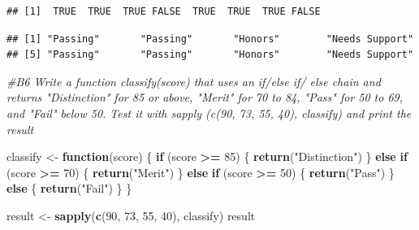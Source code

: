 \documentclass[
]{article}
\newenvironment{Shaded}{\begin{snugshade}}{\end{snugshade}}
\newcommand{\CommentTok}[1]{\textcolor[rgb]{0.56,0.35,0.01}{\textit{#1}}}
\newcommand{\ControlFlowTok}[1]{\textcolor[rgb]{0.13,0.29,0.53}{\textbf{#1}}}
\newcommand{\DecValTok}[1]{\textcolor[rgb]{0.00,0.00,0.81}{#1}}
\newcommand{\FunctionTok}[1]{\textcolor[rgb]{0.13,0.29,0.53}{\textbf{#1}}}
\newcommand{\NormalTok}[1]{#1}
\newcommand{\OtherTok}[1]{\textcolor[rgb]{0.56,0.35,0.01}{#1}}
\newcommand{\SpecialCharTok}[1]{\textcolor[rgb]{0.81,0.36,0.00}{\textbf{#1}}}
\newcommand{\StringTok}[1]{\textcolor[rgb]{0.31,0.60,0.02}{#1}}
\begin{document}
\begin{verbatim}
## [1]  TRUE  TRUE  TRUE FALSE  TRUE  TRUE  TRUE FALSE
\end{verbatim}

\begin{Shaded}
\end{Shaded}

\begin{verbatim}
## [1] "Passing"       "Passing"       "Honors"        "Needs Support"
## [5] "Passing"       "Passing"       "Honors"        "Needs Support"
\end{verbatim}

\begin{Shaded}
\begin{Highlighting}[]
\CommentTok{\#B6 Write a function classify(score) that uses an if/else if/ else chain and returns "Distinction" for 85 or above, "Merit" for 70 to 84, "Pass" for 50 to 69, and "Fail" below 50. Test it with sapply (c(90, 73, 55, 40), classify) and print the result}

\NormalTok{classify }\OtherTok{\textless{}{-}} \ControlFlowTok{function}\NormalTok{(score) \{}
  \ControlFlowTok{if}\NormalTok{ (score }\SpecialCharTok{\textgreater{}=} \DecValTok{85}\NormalTok{) \{}
    \FunctionTok{return}\NormalTok{(}\StringTok{"Distinction"}\NormalTok{)}
\NormalTok{  \} }\ControlFlowTok{else} \ControlFlowTok{if}\NormalTok{ (score }\SpecialCharTok{\textgreater{}=} \DecValTok{70}\NormalTok{) \{}
    \FunctionTok{return}\NormalTok{(}\StringTok{"Merit"}\NormalTok{)}
\NormalTok{  \} }\ControlFlowTok{else} \ControlFlowTok{if}\NormalTok{ (score }\SpecialCharTok{\textgreater{}=} \DecValTok{50}\NormalTok{) \{}
    \FunctionTok{return}\NormalTok{(}\StringTok{"Pass"}\NormalTok{)}
\NormalTok{  \} }\ControlFlowTok{else}\NormalTok{ \{}
    \FunctionTok{return}\NormalTok{(}\StringTok{"Fail"}\NormalTok{)}
\NormalTok{  \}}
\NormalTok{\}}

\NormalTok{result }\OtherTok{\textless{}{-}} \FunctionTok{sapply}\NormalTok{(}\FunctionTok{c}\NormalTok{(}\DecValTok{90}\NormalTok{, }\DecValTok{73}\NormalTok{, }\DecValTok{55}\NormalTok{, }\DecValTok{40}\NormalTok{), classify)}
\NormalTok{result}
\end{Highlighting}
\end{Shaded}
\end{document}
